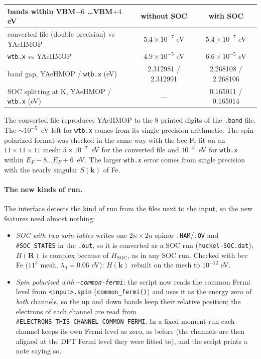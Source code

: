 \documentclass[11pt,a4paper]{article}
\newcommand{\fn}[1]{\texttt{#1()}}
\newcommand{\opt}[1]{\texttt{#1}}
\newcommand{\Hsoc}{H_{\mathrm{SOC}}}
\begin{document}
\begin{center}
\begin{tabular}{l c c}
\toprule
bands within VBM$-6$ \ldots VBM$+4$ eV & without SOC & with SOC \\
\midrule
converted file (double precision) vs YAeHMOP & $5.4\times10^{-7}$ eV & $5.4\times10^{-7}$ eV \\
\texttt{wtb.x} vs YAeHMOP & $4.9\times10^{-5}$ eV & $6.6\times10^{-5}$ eV \\
band gap, YAeHMOP / \texttt{wtb.x} (eV) & 2.312981 / 2.312991 & 2.268108 / 2.268106 \\
SOC splitting at K, YAeHMOP / \texttt{wtb.x} (eV) & --- & 0.165011 / 0.165014 \\
\bottomrule
\end{tabular}
\end{center}

The converted file reproduces YAeHMOP to the 8 printed digits of the \texttt{.band} file.
The $\sim10^{-5}$~eV left for \texttt{wtb.x} comes from its single-precision arithmetic.
The spin-polarized format was checked in the same way with the bcc Fe fit on an
$11\times11\times11$ mesh: $5\times10^{-7}$~eV for the converted file and $10^{-3}$~eV for
\texttt{wtb.x} within $E_F-8\ldots E_F+6$~eV. The larger \texttt{wtb.x} error comes from
single precision with the nearly singular $S(\mathbf{k})$ of Fe.


\paragraph{The new kinds of run.} The interface detects the kind of run from the files
next to the input, so the new features need almost nothing:
\begin{itemize}
\item \emph{SOC with two spin tables} writes one $2n\times2n$ spinor \texttt{.HAM}/\texttt{.OV}
  and \texttt{\#SOC\_STATES} in the \texttt{.out}, so it is converted as a SOC run
  (\texttt{huckel-SOC.dat}); $H(\mathbf{R})$ is complex because of $\Hsoc$, as in any SOC
  run. Checked with bcc Fe ($11^3$ mesh, $\lambda_d=0.06$ eV): $H(\mathbf{k})$ rebuilt on the
  mesh to $10^{-12}$ eV.
\item \emph{Spin polarized with \opt{--common-fermi}}: the script now reads the common
  Fermi level from \texttt{<input>.spin} (\fn{common\_fermi}) and uses it as the energy
  zero of \emph{both} channels, so the up and down bands keep their relative position;
  the electrons of each channel are read from
  \texttt{\#ELECTRONS\_THIS\_CHANNEL\_COMMON\_FERMI}. In a fixed-moment run each channel
  keeps its own Fermi level as zero, as before (the channels are then aligned at the DFT
  Fermi level they were fitted to), and the script prints a note saying so.
\end{itemize}
\end{document}

